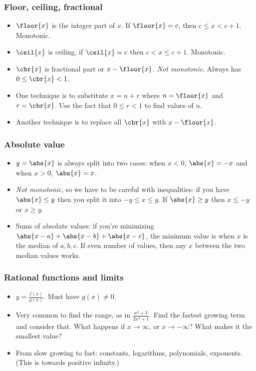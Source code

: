 \documentclass[10pt,paper=letter]{scrartcl}
\begin{document}
\subsubsection*{Floor, ceiling, fractional}

\begin{itemize}
  \item $\floor{x}$ is the integer part of $x$. If $\floor{x} = c$, then $c \leq x < c + 1$. Monotonic.
  \item $\ceil{x}$ is ceiling, if $\ceil{x} = c$ then $c < x \leq c + 1$. Monotonic.
  \item $\cbr{x}$ is fractional part or $x - \floor{x}$. \emph{Not monotonic}. Always has $0 \leq \cbr{x} < 1$.
  \item One technique is to substitute $x = n + r$ where $n = \floor{x}$ and $r = \cbr{x}$. Use the fact that $0 \leq r < 1$ to find values of $n$. 
  \item Another technique is to replace all $\cbr{x}$ with $x - \floor{x}$.
\end{itemize}

\subsubsection*{Absolute value}

\begin{itemize}
  \item $y = \abs{x}$ is always split into two cases: when $x < 0$, $\abs{x} = -x$ and when $x > 0$, $\abs{x} = x$. 
  \item \emph{Not monotonic}, so we have to be careful with inequalities: if you have $\abs{x} \leq y$ then you split it into $-y \leq x \leq y$. If $\abs{x} \geq y$ then $x \leq -y$ or $x \geq y$. 
  \item Sums of absolute values: if you're minimizing $\abs{x-a} + \abs{x-b} + \abs{x-c}$, the minimum value is when $x$ is the median of $a, b, c$. If even number of values, then any $x$ between the two median values works.
\end{itemize}

\subsubsection*{Rational functions and limits}

\begin{itemize}
  \item $y = \frac{f(x)}{g(x)}$. Must have $g(x) \neq 0$.
  \item Very common to find the range, as in $\frac{x^4 + 3}{2x^4 + 1}$. Find the fastest growing term and consider that. What happens if $x \to \infty$, or $x \to -\infty$? What makes it the smallest value?
  \item From slow growing to fast: constants, logarithms, polynomials, exponents. (This is towards positive infinity.)
\end{itemize}
\end{document}
